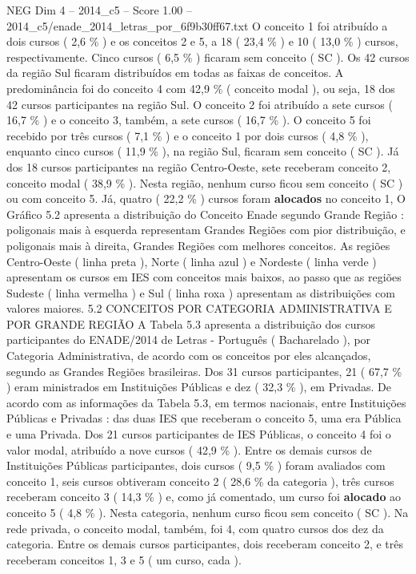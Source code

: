 \begin{textsample}{NEG Dim 4 – 2014\_c5 – Score 1.00 – 2014\_c5/enade\_2014\_letras\_por\_6f9b30ff67.txt}
O conceito 1 foi atribuído a dois cursos ( 2,6 \% ) e os conceitos 2 e 5, a 18 ( 23,4 \% ) e 10 ( 13,0 \% ) cursos, respectivamente.
Cinco cursos ( 6,5 \% ) ficaram sem conceito ( SC ).
Os 42 cursos da região Sul ficaram distribuídos em todas as faixas de conceitos.
A predominância foi do conceito 4 com 42,9 \% ( conceito modal ), ou seja, 18 dos 42 cursos participantes na região Sul.
O conceito 2 foi atribuído a sete cursos ( 16,7 \% ) e o conceito 3, também, a sete cursos ( 16,7 \% ).
O conceito 5 foi recebido por três cursos ( 7,1 \% ) e o conceito 1 por dois cursos ( 4,8 \% ), enquanto cinco cursos ( 11,9 \% ), na região Sul, ficaram sem conceito ( SC ).
Já dos 18 cursos participantes na região Centro-Oeste, sete receberam conceito 2, conceito modal ( 38,9 \% ).
Nesta região, nenhum curso ficou sem conceito ( SC ) ou com conceito 5.
Já, quatro ( 22,2 \% ) cursos foram \textbf{alocados} no conceito 1, O Gráfico 5.2 apresenta a distribuição do Conceito Enade segundo Grande Região : poligonais mais à esquerda representam Grandes Regiões com pior distribuição, e poligonais mais à direita, Grandes Regiões com melhores conceitos.
As regiões Centro-Oeste ( linha preta ), Norte ( linha azul ) e Nordeste ( linha verde ) apresentam os cursos em IES com conceitos mais baixos, ao passo que as regiões Sudeste ( linha vermelha ) e Sul ( linha roxa ) apresentam as distribuições com valores maiores. 5.2 CONCEITOS POR CATEGORIA ADMINISTRATIVA E POR GRANDE REGIÃO A Tabela 5.3 apresenta a distribuição dos cursos participantes do ENADE/2014 de Letras - Português ( Bacharelado ), por Categoria Administrativa, de acordo com os conceitos por eles alcançados, segundo as Grandes Regiões brasileiras.
Dos 31 cursos participantes, 21 ( 67,7 \% ) eram ministrados em Instituições Públicas e dez ( 32,3 \% ), em Privadas.
De acordo com as informações da Tabela 5.3, em termos nacionais, entre Instituições Públicas e Privadas : das duas IES que receberam o conceito 5, uma era Pública e uma Privada.
Dos 21 cursos participantes de IES Públicas, o conceito 4 foi o valor modal, atribuído a nove cursos ( 42,9 \% ).
Entre os demais cursos de Instituições Públicas participantes, dois cursos ( 9,5 \% ) foram avaliados com conceito 1, seis cursos obtiveram conceito 2 ( 28,6 \% da categoria ), três cursos receberam conceito 3 ( 14,3 \% ) e, como já comentado, um curso foi \textbf{alocado} ao conceito 5 ( 4,8 \% ).
Nesta categoria, nenhum curso ficou sem conceito ( SC ).
Na rede privada, o conceito modal, também, foi 4, com quatro cursos dos dez da categoria.
Entre os demais cursos participantes, dois receberam conceito 2, e três receberam conceitos 1, 3 e 5 ( um curso, cada ).

\end{textsample}
